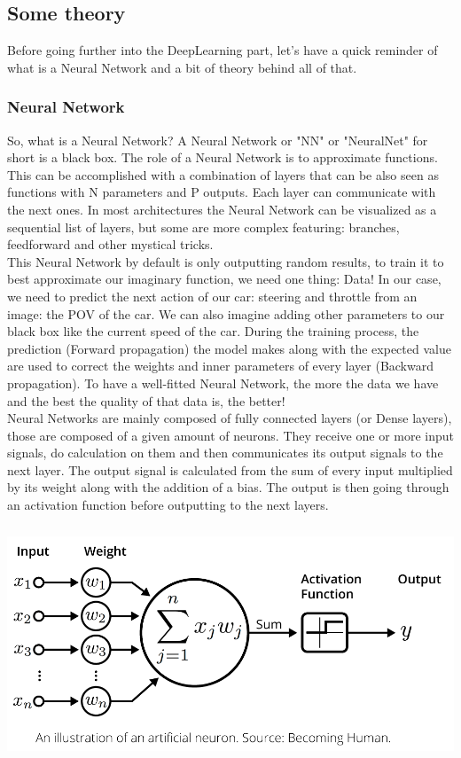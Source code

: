 \documentclass[12pt]{article}
\begin{document}
\newpage

\subsection{Some theory}
Before going further into the DeepLearning part, let's have a quick reminder of what is a Neural Network and a bit of theory behind all of that. \\

\subsubsection{Neural Network}
So, what is a Neural Network? 
A Neural Network or "NN" or "NeuralNet" for short is a black box. The role of a Neural Network is to approximate functions. This can be accomplished with a combination of layers that can be also seen as functions with N parameters and P outputs. Each layer can communicate with the next ones. In most architectures the Neural Network can be visualized as a sequential list of layers, but some are more complex featuring: branches, feedforward and other mystical tricks. \\

This Neural Network by default is only outputting random results, to train it to best approximate our imaginary function, we need one thing: Data! In our case, we need to predict the next action of our car: steering and throttle from an image: the POV of the car. We can also imagine adding other parameters to our black box like the current speed of the car.
During the training process, the prediction (Forward propagation) the model makes along with the expected value are used to correct the weights and inner parameters of every layer (Backward propagation). To have a well-fitted Neural Network, the more the data we have and the best the quality of that data is, the better! \\

Neural Networks are mainly composed of fully connected layers (or Dense layers), those are composed of a given amount of neurons. They receive one or more input signals, do calculation on them and then communicates its output signals to the next layer. The output signal is calculated from the sum of every input multiplied by its weight along with the addition of a bias. The output is then going through an activation function before outputting to the next layers. \\

\centerline{\includegraphics[height=7cm]{../../docs/activation-function.png}}
\end{document}
